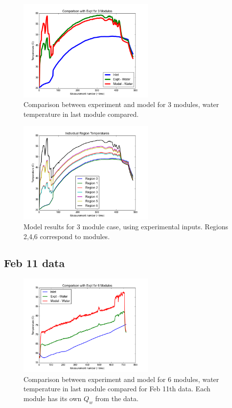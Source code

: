 \documentclass[11pt]{article}
\begin{document}
\begin{figure}[!ht]
\centering
\includegraphics[width=0.6\textwidth]{nov25.png}
\caption{Comparison between experiment and model for 3 modules, water temperature in last module compared.}
\end{figure}
\begin{figure}[!ht]
\centering
\includegraphics[width=0.6\textwidth]{nov25modules.png}
\caption{Model results for 3 module case, using experimental inputs. Regions 2,4,6 correspond to modules.}
\end{figure}
\subsection{Feb 11 data}
\begin{figure}[!ht]
\centering
\includegraphics[width=0.6\textwidth]{feb11.png}
\caption{Comparison between experiment and model for 6 modules, water temperature in last module compared for Feb 11th data. Each module has its own $Q_w$ from the data.}
\end{figure}
\end{document}
